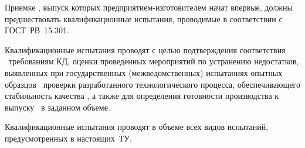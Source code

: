 \point
Приемке \dut, выпуск которых предприятием-изготовителем начат впервые, должны предшествовать квалификационные испытания, проводимые в соответствии с ГОСТ~РВ~15.301.

\point
Квалификационные испытания проводят с целью подтверждения  соответствия \dut \ требованиям КД, оценки проведенных мероприятий по устранению недостатков, выявленных при государственных (межведомственных) испытаниях опытных образцов \dut \, проверки разработанного технологического процесса, обеспечивающего стабильность качества \dut, а также для определения готовности производства к выпуску \dut \ в заданном объеме.

\point
Квалификационные испытания проводят в объеме всех видов испытаний, предусмотренных в настоящих~ТУ.